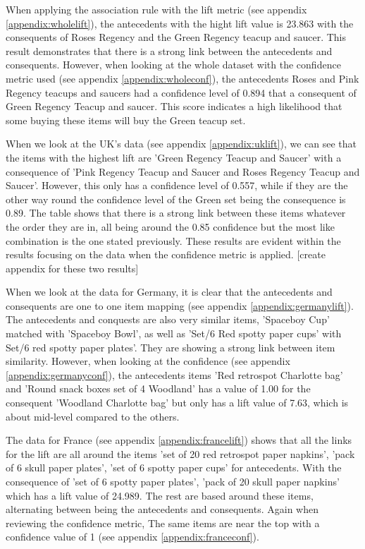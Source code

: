 \documentclass[a4paper,10pt]{article}
\begin{document}
When applying the association rule with the lift metric (see appendix \ref{appendix:wholelift}), the antecedents with the hight lift value is 23.863 with the consequents of Roses Regency and the Green Regency teacup and saucer. This result demonstrates that there is a strong link between the antecedents and consequents. However, when looking at the whole dataset with the confidence metric used (see appendix \ref{appendix:wholeconf}), the antecedents Roses and Pink Regency teacups and saucers had a confidence level of 0.894 that a consequent of Green Regency Teacup and saucer. This score indicates a high likelihood that some buying these items will buy the Green teacup set.

When we look at the UK's data (see appendix \ref{appendix:uklift}), we can see that the items with the highest lift are 'Green Regency Teacup and Saucer' with a consequence of 'Pink Regency Teacup and Saucer and Roses Regency Teacup and Saucer'. However, this only has a confidence level of 0.557, while if they are the other way round the confidence level of the Green set being the consequence is 0.89. The table shows that there is a strong link between these items whatever the order they are in, all being around the 0.85 confidence but the most like combination is the one stated previously. These results are evident within the results focusing on the data when the confidence metric is applied. [create appendix for these two results]

When we look at the data for Germany, it is clear that the antecedents and consequents are one to one item mapping (see appendix \ref{appendix:germanylift}). The antecedents and conquests are also very similar items, 'Spaceboy Cup' matched with 'Spaceboy Bowl', as well as 'Set/6 Red spotty paper cups' with Set/6 red spotty paper plates'. They are showing a strong link between item similarity. However, when looking at the confidence (see appendix \ref{appendix:germanyconf}), the antecedents items 'Red retrospot Charlotte bag' and 'Round snack boxes set of 4 Woodland' has a value of 1.00 for the consequent 'Woodland Charlotte bag' but only has a lift value of 7.63, which is about mid-level compared to the others.

The data for France (see appendix \ref{appendix:francelift}) shows that all the links for the lift are all around the items 'set of 20 red retrospot paper napkins', 'pack of 6 skull paper plates', 'set of 6 spotty paper cups' for antecedents. With the consequence of 'set of 6 spotty paper plates', 'pack of 20 skull paper napkins' which has a lift value of 24.989. The rest are based around these items, alternating between being the antecedents and consequents. Again when reviewing the confidence metric, The same items are near the top with a confidence value of 1 (see appendix \ref{appendix:franceconf}).
\end{document}
